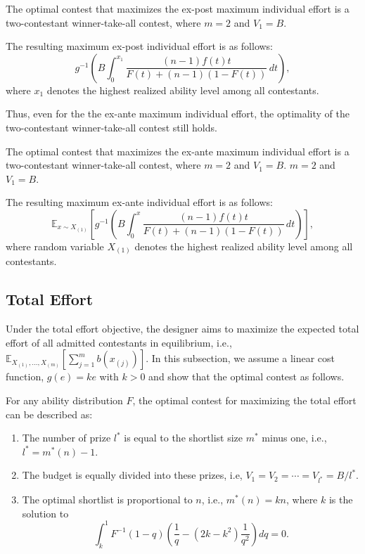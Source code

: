 \begin{theorem}\label{thm:ExpostHighestEffort}
    The optimal contest that maximizes the ex-post maximum individual effort is a two-contestant winner-take-all contest, where $m=2$ and $V_1=B$.

    The resulting maximum ex-post individual effort is as follows:
    \[
    g^{-1}\left ( B \int_{0}^{x_{1}} \frac{(n-1)f(t)t}{F(t)+(n-1)(1-F(t))} \, dt \right ),
    \]
    where $x_1$ denotes the highest realized ability level among all contestants.
\end{theorem}

Thus, even for the the ex-ante maximum individual effort, the optimality of the two-contestant winner-take-all contest still holds.

\begin{corollary}\label{coro:OptimalMaximumEffort}
    The optimal contest that maximizes the ex-ante maximum individual effort is a two-contestant winner-take-all contest, where $m=2$ and $V_1=B$. $m=2$ and $V_1=B$.

    The resulting maximum ex-ante individual effort is as follows:
    \[
    \mathbb{E}_{x\sim X_{(1)}} \left [ g^{-1}\left ( B \int_{0}^{x} \frac{(n-1)f(t)t}{F(t)+(n-1)(1-F(t))} \, dt \right ) \right ],
    \]
    where random variable $X_{(1)}$ denotes the highest realized ability level among all contestants.
\end{corollary}

\subsection{Total Effort}\label{subsec:TotalEffort}

Under the total effort objective, the designer aims to maximize the expected total effort of all admitted contestants in equilibrium, i.e., $\mathbb{E}_{X_{(1)}, \ldots, X_{(m)}}[\sum_{j=1}^{m}b(x_{(j)})]$.
In this subsection, we assume a linear cost function, $g(e)=ke$ with $k>0$ and show that the optimal contest as follows.
\begin{theorem}\label{thm: opt for total}
    For any ability distribution $F$, the optimal contest for maximizing the total effort can be described as:
    \begin{enumerate}
        \item The number of prize $l^*$ is equal to the shortlist size $m^*$ minus one, i.e., $l^*=m^*(n)-1$.
        \item The budget is equally divided into these prizes, i.e, $V_1=V_2=\cdots= V_{l^*}=B/l^*$.
        \item The optimal shortlist is proportional to $n$, i.e., $m^*(n)=kn$, where $k$ is the solution to 
        \[
            \int_k^1 F^{-1}(1-q)(\frac{1}{q}-(2k-k^2)\frac{1}{q^2})dq=0.
        \]
    \end{enumerate}
\end{theorem}

